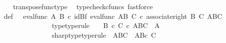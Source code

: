 \begin{isabellebody}
\ \ \ \ \isamarkupfalse%
\ transpose{\isacharunderscore}{\kern0pt}func{\isacharunderscore}{\kern0pt}type\ \isamarkupfalse%
\ {\isacharparenleft}{\kern0pt}typecheck{\isacharunderscore}{\kern0pt}cfuncs{\isacharcomma}{\kern0pt}\ fastforce{\isacharparenright}{\kern0pt}\isanewline
\isanewline
\ \ \isamarkupfalse%
\ {\isasympsi}\ \ {\isasympsi}{\isacharunderscore}{\kern0pt}def{\isacharcolon}{\kern0pt}\ {\isachardoublequoteopen}{\isasympsi}\ {\isacharequal}{\kern0pt}\ {\isacharparenleft}{\kern0pt}eval{\isacharunderscore}{\kern0pt}func\ A\ B{\isacharparenright}{\kern0pt}\ {\isasymcirc}\isactrlsub c\ {\isacharparenleft}{\kern0pt}id{\isacharparenleft}{\kern0pt}B{\isacharparenright}{\kern0pt}{\isasymtimes}\isactrlsub f\ eval{\isacharunderscore}{\kern0pt}func\ {\isacharparenleft}{\kern0pt}A\isactrlbsup B\isactrlesup {\isacharparenright}{\kern0pt}\ C{\isacharparenright}{\kern0pt}\ {\isasymcirc}\isactrlsub c\ {\isacharparenleft}{\kern0pt}associate{\isacharunderscore}{\kern0pt}right\ B\ C\ {\isacharparenleft}{\kern0pt}{\isacharparenleft}{\kern0pt}A\isactrlbsup B\isactrlesup {\isacharparenright}{\kern0pt}\isactrlbsup C\isactrlesup {\isacharparenright}{\kern0pt}{\isacharparenright}{\kern0pt}{\isachardoublequoteclose}\ \isanewline
\ \ \ \ \ \ \ \ \ \ \ \ \ \ \ \ \ {\isasympsi}{\isacharunderscore}{\kern0pt}type{\isacharbrackleft}{\kern0pt}type{\isacharunderscore}{\kern0pt}rule{\isacharbrackright}{\kern0pt}{\isacharcolon}{\kern0pt}\ {\isachardoublequoteopen}{\isasympsi}\ {\isacharcolon}{\kern0pt}\ \ {\isacharparenleft}{\kern0pt}B\ {\isasymtimes}\isactrlsub c\ C{\isacharparenright}{\kern0pt}\ {\isasymtimes}\isactrlsub c\ {\isacharparenleft}{\kern0pt}{\isacharparenleft}{\kern0pt}A\isactrlbsup B\isactrlesup {\isacharparenright}{\kern0pt}\isactrlbsup C\isactrlesup {\isacharparenright}{\kern0pt}\ {\isasymrightarrow}\ A{\isachardoublequoteclose}\ \isanewline
\ \ \ \ \ \ \ \ \ \ \ \ \ \ \ \ \ {\isasympsi}sharp{\isacharunderscore}{\kern0pt}type{\isacharbrackleft}{\kern0pt}type{\isacharunderscore}{\kern0pt}rule{\isacharbrackright}{\kern0pt}{\isacharcolon}{\kern0pt}\ {\isachardoublequoteopen}{\isasympsi}\isactrlsup {\isasymsharp}{\isacharcolon}{\kern0pt}\ {\isacharparenleft}{\kern0pt}A\isactrlbsup B\isactrlesup {\isacharparenright}{\kern0pt}\isactrlbsup C\isactrlesup \ {\isasymrightarrow}\ {\isacharparenleft}{\kern0pt}A\isactrlbsup {\isacharparenleft}{\kern0pt}B{\isasymtimes}\isactrlsub c\ C{\isacharparenright}{\kern0pt}\isactrlesup {\isacharparenright}{\kern0pt}{\isachardoublequoteclose}\isanewline

\end{isabellebody}
